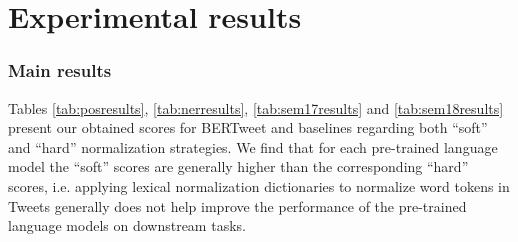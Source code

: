 \documentclass[11pt,a4paper]{article}
\begin{document}
\begin{table}[!t]
    \centering
{}
    \caption{Performance scores on the SemEval2018-Task3A test set. F\textsubscript{1}---the main ranking metric---denotes the F\textsubscript{1} score computed for the positive label.}
    \label{tab:sem18results}
\end{table}
 
 
 \section{Experimental results}\label{sec:results}
 
\subsubsection*{Main results} 


Tables \ref{tab:posresults}, \ref{tab:nerresults}, \ref{tab:sem17results} and \ref{tab:sem18results} present our obtained scores for  BERTweet and baselines regarding  both ``soft'' and ``hard'' normalization strategies. 
We find that for each pre-trained language model the ``soft'' scores are generally higher than the corresponding ``hard'' scores, i.e. applying lexical normalization dictionaries to normalize word tokens in Tweets generally does not help improve the performance of the pre-trained language models on downstream tasks. 
\end{document}
